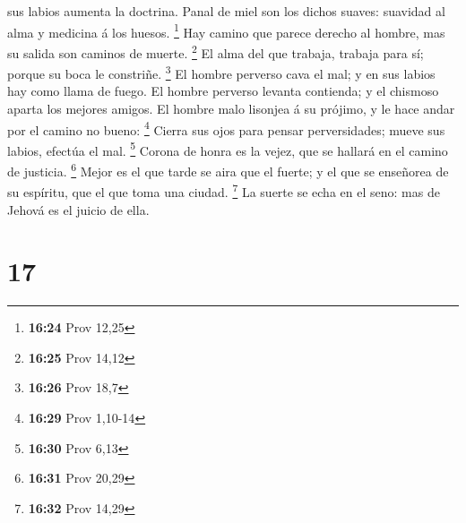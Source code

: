 sus labios aumenta la doctrina.  Panal de miel son los
dichos suaves: suavidad al alma y medicina á los huesos. \footnote{\textbf{16:24}
  Prov 12,25}  Hay camino que parece derecho al hombre, mas
su salida son caminos de muerte. \footnote{\textbf{16:25} Prov 14,12}
 El alma del que trabaja, trabaja para sí; porque su boca
le constriñe. \footnote{\textbf{16:26} Prov 18,7}  El
hombre perverso cava el mal; y en sus labios hay como llama de fuego.
 El hombre perverso levanta contienda; y el chismoso aparta
los mejores amigos.  El hombre malo lisonjea á su prójimo,
y le hace andar por el camino no bueno: \footnote{\textbf{16:29} Prov
  1,10-14}  Cierra sus ojos para pensar perversidades;
mueve sus labios, efectúa el mal. \footnote{\textbf{16:30} Prov 6,13}
 Corona de honra es la vejez, que se hallará en el camino
de justicia. \footnote{\textbf{16:31} Prov 20,29}  Mejor es
el que tarde se aira que el fuerte; y el que se enseñorea de su
espíritu, que el que toma una ciudad. \footnote{\textbf{16:32} Prov
  14,29}  La suerte se echa en el seno: mas de Jehová es el
juicio de ella.

\hypertarget{section-16}{%
\section{17}\label{section-16}}

